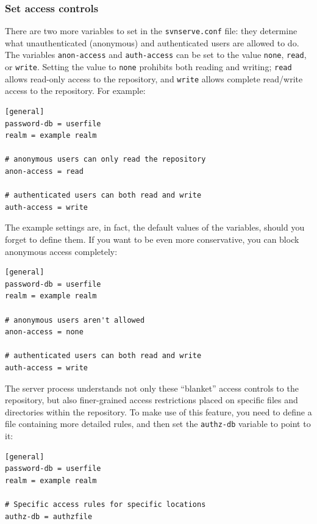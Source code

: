 \subsubsection{Set access
controls}\label{svn.serverconfig.svnserve.auth.general}

There are two more variables to set in the \texttt{svnserve.conf} file:
they determine what unauthenticated (anonymous) and authenticated users
are allowed to do. The variables \texttt{anon-access} and
\texttt{auth-access} can be set to the value \texttt{none},
\texttt{read}, or \texttt{write}. Setting the value to \texttt{none}
prohibits both reading and writing; \texttt{read} allows read-only
access to the repository, and \texttt{write} allows complete read/write
access to the repository. For example:

\begin{verbatim}
[general]
password-db = userfile
realm = example realm

# anonymous users can only read the repository
anon-access = read

# authenticated users can both read and write
auth-access = write
\end{verbatim}

The example settings are, in fact, the default values of the variables,
should you forget to define them. If you want to be even more
conservative, you can block anonymous access completely:

\begin{verbatim}
[general]
password-db = userfile
realm = example realm

# anonymous users aren't allowed
anon-access = none

# authenticated users can both read and write
auth-access = write
\end{verbatim}

The server process understands not only these ``blanket'' access
controls to the repository, but also finer-grained access restrictions
placed on specific files and directories within the repository. To make
use of this feature, you need to define a file containing more detailed
rules, and then set the \texttt{authz-db} variable to point to it:

\begin{verbatim}
[general]
password-db = userfile
realm = example realm

# Specific access rules for specific locations
authz-db = authzfile
\end{verbatim}

